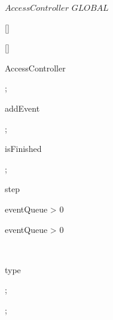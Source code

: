 \kClass $AccessController$ \kISO $GLOBAL$
\par
\kInstanceVarDef
\parlinebr
\begin{insvar}
[{\seq{}}]
\end{insvar}
\begin{insvar}
[{\True }]
\end{insvar}
\par
\kOperations
{}\begin{op}[e]{AccessController}%
\signature{() \Oto AccessController}
\parms{}
\return{\mbox{}};
\end{op}
\begin{op}[e]{addEvent}%
\signature{event \Oto ()}
;
\end{op}
\begin{op}[e]{isFinished}%
\signature{() \Oto ()}
\parms{}
\Skip ;
\end{op}
\begin{op}[e]{step}%
\signature{() \Oto ()}
\parms{}
\begin{blockstmt}
\If  \Len eventQueue > 0
\Then \\
\begin{while}{ \Len eventQueue > 0}
\begin{blockstmt}
\begin{defstmt}
\end{defstmt} \\
\begin{blockstmt}
\begin{Cases}{type}
\end{Cases} ; \\
\end{blockstmt}
\end{blockstmt}
\end{while}
\Fi
\end{blockstmt};
\end{op}
